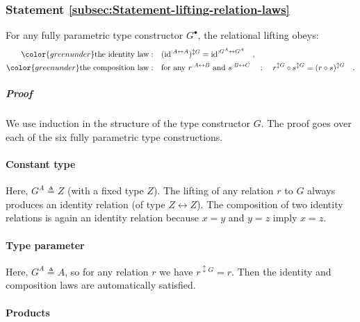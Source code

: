 \subsubsection{Statement \label{subsec:Statement-lifting-relation-laws}\ref{subsec:Statement-lifting-relation-laws}}

For any fully parametric type constructor $G^{\bullet}$, the relational
lifting obeys:
\begin{align*}
{\color{greenunder}\text{the identity law}:}\quad & (\text{id}^{:A\leftrightarrow A})^{\updownarrow G}=\text{id}^{:G^{A}\leftrightarrow G^{A}}\quad,\\
{\color{greenunder}\text{the composition law}:}\quad & \text{for any }r^{:A\leftrightarrow B}\text{ and }s^{:B\leftrightarrow C}\quad:\quad r^{\updownarrow G}\circ s^{\updownarrow G}=(r\circ s)^{\updownarrow G}\quad.
\end{align*}


\subparagraph{Proof}

We use induction in the structure of the type constructor $G$. The
proof goes over each of the six fully parametric type constructions.

\paragraph{Constant type}

Here, $G^{A}\triangleq Z$ (with a fixed type $Z$). The lifting of
any relation $r$ to $G$ always produces an identity relation (of
type $Z\leftrightarrow Z$). The composition of two identity relations
is again an identity relation because $x=y$ and $y=z$ imply $x=z$.

\paragraph{Type parameter}

Here, $G^{A}\triangleq A$, so for any relation $r$ we have $r^{\updownarrow G}=r$.
Then the identity and composition laws are automatically satisfied.

\paragraph{Products}

